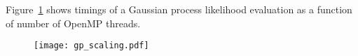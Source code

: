 Figure~\ref{fig:gp} shows timings of a Gaussian process likelihood evaluation
as a function of number of OpenMP threads. 

%
%
%
%
\begin{figure}
  \texttt{[image: gp\_scaling.pdf]}
  \label{fig:gp}
\end{figure}
